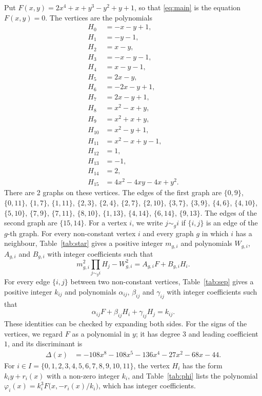 \documentclass[11pt]{article}
\begin{document}
Put $F(x,y)=2x^{4}+x+y^{3}-y^{2}+y+1$, so that \eqref{eq:main} is the equation $F(x,y)=0$. The vertices are the polynomials
\begin{align*}
H_{0}&=-x-y+1,\\
H_{1}&=-y-1,\\
H_{2}&=x-y,\\
H_{3}&=-x-y-1,\\
H_{4}&=x-y-1,\\
H_{5}&=2x-y,\\
H_{6}&=-2x-y+1,\\
H_{7}&=2x-y+1,\\
H_{8}&=x^{2}-x+y,\\
H_{9}&=x^{2}+x+y,\\
H_{10}&=x^{2}-y+1,\\
H_{11}&=x^{2}-x+y-1,\\
H_{12}&=1,\\
H_{13}&=-1,\\
H_{14}&=2,\\
H_{15}&=4x^{2}-4xy-4x+y^{2}.
\end{align*}
There are 2 graphs on these vertices. The edges of the first graph are $\{0,9\}$, $\{0,11\}$, $\{1,7\}$, $\{1,11\}$, $\{2,3\}$, $\{2,4\}$, $\{2,7\}$, $\{2,10\}$, $\{3,7\}$, $\{3,9\}$, $\{4,6\}$, $\{4,10\}$, $\{5,10\}$, $\{7,9\}$, $\{7,11\}$, $\{8,10\}$, $\{1,13\}$, $\{4,14\}$, $\{6,14\}$, $\{9,13\}$. The edges of the second graph are $\{15,14\}$. For a vertex $i$, we write $j\sim_g i$ if $\{i,j\}$ is an edge of the $g$-th graph.
For every non-constant vertex $i$ and every graph $g$ in which $i$ has a neighbour, Table~\ref{tab:star} gives a positive integer $m_{g,i}$ and polynomials $W_{g,i}$, $A_{g,i}$ and $B_{g,i}$ with integer coefficients such that
\begin{equation}\label{eq:star}
m_{g,i}^2\prod_{j\sim_g i}H_j-W_{g,i}^2=A_{g,i}F+B_{g,i}H_i.
\end{equation}
For every edge $\{i,j\}$ between two non-constant vertices, Table~\ref{tab:sep} gives a positive integer $k_{ij}$ and polynomials $\alpha_{ij}$, $\beta_{ij}$ and $\gamma_{ij}$ with integer coefficients such that
\begin{equation}\label{eq:sep}
\alpha_{ij}F+\beta_{ij}H_i+\gamma_{ij}H_j=k_{ij}.
\end{equation}
These identities can be checked by expanding both sides.
For the signs of the vertices, we regard $F$ as a polynomial in $y$; it has degree $3$ and leading coefficient $1$, and its discriminant is
\begin{align*}
\Delta(x)&=-108x^{8}-108x^{5}-136x^{4}-27x^{2}-68x-44.
\end{align*}
For $i\in I=\{0,\allowbreak 1,\allowbreak 2,\allowbreak 3,\allowbreak 4,\allowbreak 5,\allowbreak 6,\allowbreak 7,\allowbreak 8,\allowbreak 9,\allowbreak 10,\allowbreak 11\}$, the vertex $H_i$ has the form $k_iy+r_i(x)$ with a non-zero integer $k_i$, and Table~\ref{tab:phi} lists the polynomial $\varphi_i(x)=k_i^3F\bigl(x,-r_i(x)/k_i\bigr)$, which has integer coefficients.
\end{document}
